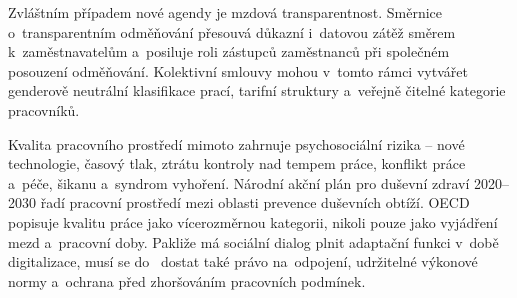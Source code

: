 Zvláštním případem nové agendy je mzdová transparentnost. Směrnice o~transparentním odměňování přesouvá důkazní i~datovou zátěž směrem k~zaměstnavatelům a~posiluje roli zástupců zaměstnanců při společném posouzení odměňování. Kolektivní smlouvy mohou v~tomto rámci vytvářet genderově neutrální klasifikace prací, tarifní struktury a~veřejně čitelné kategorie pracovníků.~\cite{eu_directive_2022_2041}~\cite{eurofound_ca_pay_equity_2026}\par


Kvalita pracovního prostředí mimoto zahrnuje psychosociální rizika -- nové technologie, časový tlak, ztrátu kontroly nad tempem práce, konflikt práce a~péče, šikanu a~syndrom vyhoření. Národní akční plán pro duševní zdraví 2020--2030 řadí pracovní prostředí mezi oblasti prevence duševních obtíží. \ac{OECD} popisuje kvalitu práce jako vícerozměrnou kategorii, nikoli pouze jako vyjádření mezd a~pracovní doby. Pakliže má sociální dialog plnit adaptační funkci v~době digitalizace, musí se do~ dostat také právo na~odpojení, udržitelné výkonové normy a~ochrana před zhoršováním pracovních podmínek.~\cite{OECD_GoodJobsForAll_2018}\par


